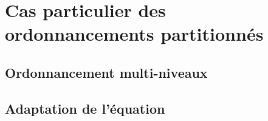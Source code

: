 \section{Cas particulier des ordonnancements partitionnés}
\label{sec:contribution_tf-ordo_p-wcrt}

\subsection{Ordonnancement multi-niveaux}
\subsection{Adaptation de l'équation}


